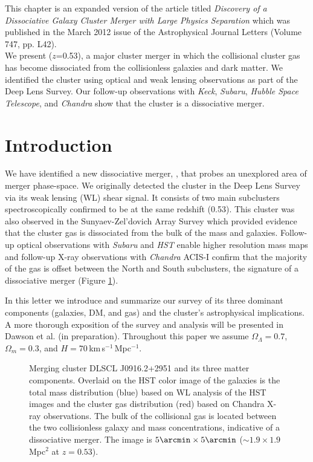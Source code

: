 \label{chapter:2}

\noindent This chapter is an expanded version of the article titled \emph{Discovery of a Dissociative Galaxy Cluster Merger with Large Physics Separation} which was published in the March 2012 issue of the Astrophysical Journal Letters (Volume 747, pp. L42). \\

We present  ($z$=0.53), a major cluster merger in which the collisional cluster gas has become dissociated from the collisionless galaxies and dark matter.
We identified the cluster using optical and weak lensing observations as part of the Deep Lens Survey. 
Our follow-up observations with {\it Keck}, {\it Subaru}, {\it Hubble Space Telescope}, and {\it Chandra} show that the cluster is a dissociative merger.


\section{Introduction}

We have identified a new dissociative merger, , that probes an unexplored area of merger phase-space.  
We originally detected the cluster in the Deep Lens Survey \citep[DLS;][]{DLS} via its weak lensing (WL) shear signal. 
It consists of two main subclusters  spectroscopically confirmed to be at the same redshift (0.53).
This cluster was also observed in the Sunyaev-Zel'dovich Array Survey \citep{much11} which provided evidence that the cluster gas is dissociated from the bulk of the mass and galaxies.
Follow-up optical observations with {\it Subaru} and {\it HST} enable higher resolution mass maps and follow-up X-ray observations with {\it Chandra} ACIS-I confirm that the majority of the gas is offset between the North and South subclusters, the signature of a dissociative merger (Figure \ref{fig1}).

In this letter we introduce  and summarize our survey of its three dominant components (galaxies, DM, and gas) and the cluster's astrophysical implications.
A more thorough exposition of the survey and analysis will be presented in Dawson et al. (in preparation).
Throughout this paper we assume $\Omega_{\Lambda}=0.7$, $\Omega_m=0.3$, and $H=70$\,km\,s$^{-1}$\,Mpc$^{-1}$.

\begin{figure}
\caption{Merging cluster DLSCL J0916.2+2951 and its three matter components. 
Overlaid on the HST color image of the galaxies is the total mass distribution (blue) based on WL analysis of the HST images and the cluster gas distribution (red) based on Chandra X-ray observations.  
The bulk of the collisional gas is located between the two collisionless galaxy and mass concentrations, indicative of a dissociative merger. 
The image is $5\arcmin \times 5\arcmin$ ($\sim 1.9\times 1.9$\,Mpc$^2$ at $z=0.53$).\label{fig1}}
\end{figure}

